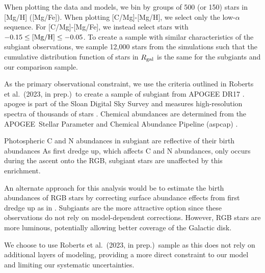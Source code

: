 \documentclass[fleqn,
usenatbib]{mnras}
\newcommand{\citetjack}{Roberts et al.~(2023, in prep.)}
\newcommand{\apogee}{APOGEE}
\newcommand{\caah}{[C/Mg]-[Mg/H]}
\newcommand{\caafe}{[C/Mg]-[Mg/Fe]}
\begin{document}
When plotting the data and models, we bin by groups of 500 (or 150) stars in [Mg/H] ([Mg/Fe]). When plotting \caah, we select only the low-$\alpha$ sequence. For \caafe, we instead select stars with $-0.15 \leq {\rm [Mg/H]} \leq -0.05$.  
To create a sample with similar characteristics of the subgiant observations, we sample 12,000 stars from the simulations such that the cumulative distribution function of stars in $R_{\rm gal}$ is the same for the subgiants and our comparison sample. 


As the primary observational constraint, we use the criteria outlined in \citetjack~to create a sample of subgiant from \apogee{} DR17 \citep{apogee17}. apogee is part of the Sloan Digital Sky Survey and measures high-resolution spectra of thousands of stars \cite{sdss17}. Chemical abundances are determined from the \apogee\ Stellar Parameter and Chemical Abundance Pipeline ({\sc aspcap}) \citep{aspcap}.  


Photospheric C and N abundances in subgiant are reflective of their birth abundances \citep{gilroy89, korn+07, lind+08, souto+18, souto19} As first dredge up, which affects C and N abundances, only occurs during the ascent onto the RGB, subgiant stars are unaffected by this enrichment. 

An alternate approach for this analysis would be to estimate the birth abundances of RGB stars by correcting surface abundance effects from first dredge up as in \cite{vincenzo+21}. Subgiants are the more attractive option since these observations do not rely on model-dependent corrections. However, RGB stars are more luminous, potentially allowing better coverage of the Galactic disk.


We choose to use \citetjack\ sample as this does not rely on additional layers of modeling, providing a more direct constraint to our model and limiting our systematic uncertainties.
\end{document}
